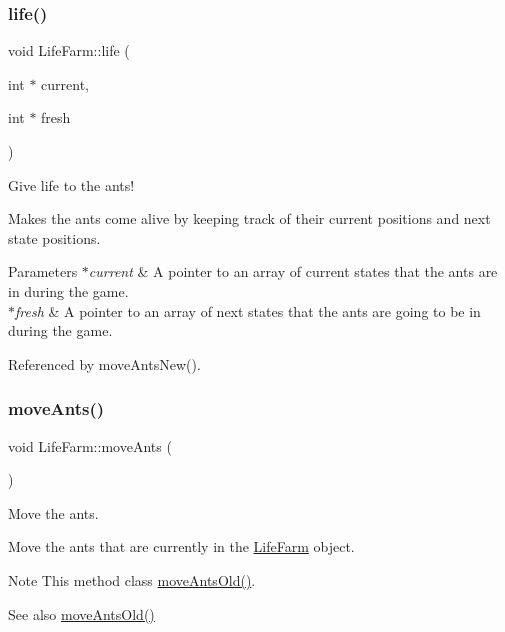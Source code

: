 \mbox{\label{class_life_farm_aa23a45af1c6a7fd82d7fcca51d864487}} 
\subsubsection{\texorpdfstring{life()}{life()}}
{\footnotesize\ttfamily void Life\+Farm\+::life (\begin{DoxyParamCaption}\item[{int $\ast$}]{current,  }\item[{int $\ast$}]{fresh }\end{DoxyParamCaption})}



Give life to the ants! 

Makes the ants come alive by keeping track of their current positions and next state positions. 
\begin{DoxyParams}{Parameters}
{\em $\ast$current} & A pointer to an array of current states that the ants are in during the game. \\
\hline
{\em $\ast$fresh} & A pointer to an array of next states that the ants are going to be in during the game. \\
\hline
\end{DoxyParams}


Referenced by move\+Ants\+New().

\mbox{\label{class_life_farm_a3a7fdaa21bdc3d302960b3ea83be95df}} 
\subsubsection{\texorpdfstring{move\+Ants()}{moveAnts()}}
{\footnotesize\ttfamily void Life\+Farm\+::move\+Ants (\begin{DoxyParamCaption}{ }\end{DoxyParamCaption})}



Move the ants. 

Move the ants that are currently in the \hyperlink{class_life_farm}{Life\+Farm} object. \begin{DoxyNote}{Note}
This method class \hyperlink{class_life_farm_a4dce4424b7820fd64d7ec489a9606f87}{move\+Ants\+Old()}. 
\end{DoxyNote}
\begin{DoxySeeAlso}{See also}
\hyperlink{class_life_farm_a4dce4424b7820fd64d7ec489a9606f87}{move\+Ants\+Old()} 
\end{DoxySeeAlso}
\mbox{\label{class_life_farm_ab4dfccfcf0cb2ac83466223b8bb4c237}} 
